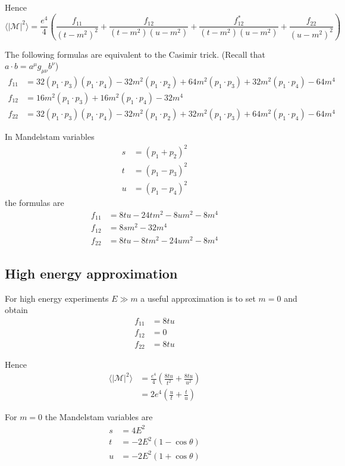 \documentclass[12pt]{article}
\begin{document}
Hence
\begin{equation*}
\langle|\mathcal{M}|^2\rangle
=
\frac{e^4}{4}
\left(
\frac{f_{11}}{(t-m^2)^2}
+\frac{f_{12}}{(t-m^2)(u-m^2)}
+\frac{f_{12}^*}{(t-m^2)(u-m^2)}
+\frac{f_{22}}{(u-m^2)^2}
\right)
\end{equation*}

The following formulas are equivalent to the Casimir trick.
(Recall that $a\cdot b=a^\mu g_{\mu\nu}b^\nu$)
\begin{align*}
f_{11}&=
 32 (p_1 \cdot p_3) (p_1 \cdot p_4) -
 32 m^2 (p_1 \cdot p_2) +
 64 m^2 (p_1 \cdot p_3) +
 32 m^2 (p_1 \cdot p_4) - 64 m^4
\\
f_{12}&=
 16 m^2 (p_1 \cdot p_3) +
 16 m^2 (p_1 \cdot p_4) - 32 m^4
\\
f_{22}&=
 32 (p_1 \cdot p_3) (p_1 \cdot p_4) -
 32 m^2 (p_1 \cdot p_2) +
 32 m^2 (p_1 \cdot p_3) +
 64 m^2 (p_1 \cdot p_4) - 64 m^4
\end{align*}

In Mandelstam variables
\begin{align*}
s&=(p_1+p_2)^2
\\
t&=(p_1-p_3)^2
\\
u&=(p_1-p_4)^2
\end{align*}
the formulas are
\begin{align*}
f_{11}&=8 t u - 24 t m^2 - 8 u m^2 - 8 m^4
\\
f_{12}&=8 s m^2 - 32 m^4
\\
f_{22}&=8 t u - 8 t m^2 - 24 u m^2 - 8 m^4
\end{align*}

\subsection*{High energy approximation}
For high energy experiments $E\gg m$ a useful approximation is to set $m=0$ and obtain
\begin{align*}
f_{11}&=8tu
\\
f_{12}&=0
\\
f_{22}&=8tu
\end{align*}

Hence
\begin{align*}
\langle|\mathcal{M}|^2\rangle
&=
\frac{e^4}{4}
\left(
\frac{8tu}{t^2}
+\frac{8tu}{u^2}
\right)
\\
&=
2e^4
\left(
\frac{u}{t}
+\frac{t}{u}
\right)
\end{align*}

For $m=0$ the Mandelstam variables are
\begin{align*}
s&=4E^2\\
t&=-2E^2(1-\cos\theta)
\\
u&=-2E^2(1+\cos\theta)
\end{align*}
\end{document}
